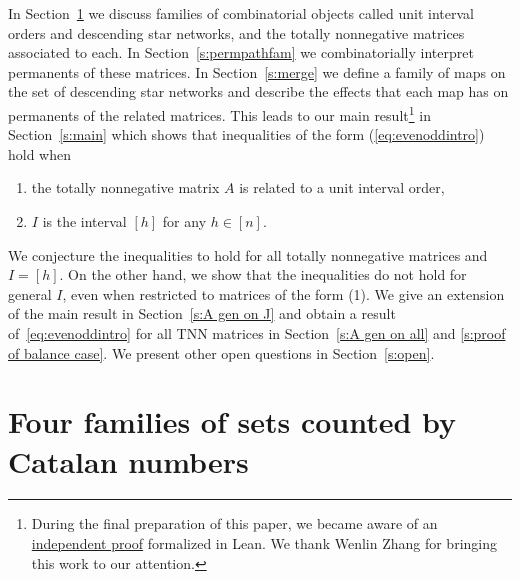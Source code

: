 \documentclass[12pt]{amsart}
\theoremstyle{definition}
\numberwithin{equation}{section}
\begin{document}
In Section~\ref{s:fourcatalan} we discuss families of combinatorial objects called unit interval orders and descending star networks, and the totally nonnegative matrices associated to each. In Section~\ref{s:permpathfam}
we combinatorially interpret permanents of these matrices.  In Section~\ref{s:merge} we define a family of maps on the set of descending star networks and describe the effects that each map has on permanents of the related matrices.
This leads to our main result\footnote{During the final preparation of this paper, we became aware of an \href{https://the-omega-institute.github.io/trureturing-mdbook/Problems/psw-bruhat-increasing-bijection.html}{independent proof} formalized in Lean. We thank Wenlin Zhang for bringing this work to our attention.} in Section~\ref{s:main}
which shows that inequalities of the form (\ref{eq:evenoddintro}) hold when
\begin{enumerate}
\item the totally nonnegative matrix $A$ is related to a unit interval order,
\item
$I$ is the interval $[h]$ for any $h \in [n]$.
\end{enumerate}
We conjecture the inequalities
to hold for all totally nonnegative matrices and $I = [h]$.
On the other hand, we show that the inequalities do not hold for general $I$, even when restricted to matrices of the form (1). We give an extension of the main result in Section~\ref{s:A gen on J} and obtain a result of~\eqref{eq:evenoddintro} for all TNN matrices in Section~\ref{s:A gen on all} and \ref{s:proof of balance case}.
We present other open questions in Section~\ref{s:open}.

\section{Four families of sets counted by Catalan numbers}\label{s:fourcatalan}
\end{document}
